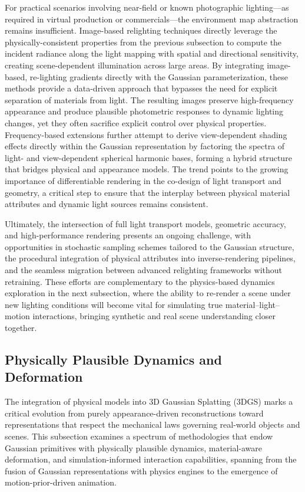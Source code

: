 \documentclass[11pt,a4paper]{article}
\begin{document}
For practical scenarios involving near-field or known photographic lighting---as required in virtual production or commercials---the environment map abstraction remains insufficient. Image-based relighting techniques directly leverage the physically-consistent properties from the previous subsection to compute the incident radiance along the light mapping with spatial and directional sensitivity, creating scene-dependent illumination across large areas. By integrating image-based, re-lighting gradients directly with the Gaussian parameterization, these methods provide a data-driven approach that bypasses the need for explicit separation of materials from light. The resulting images preserve high-frequency appearance and produce plausible photometric responses to dynamic lighting changes, yet they often sacrifice explicit control over physical properties. Frequency-based extensions further attempt to derive view-dependent shading effects directly within the Gaussian representation by factoring the spectra of light- and view-dependent spherical harmonic bases, forming a hybrid structure that bridges physical and appearance models. The trend points to the growing importance of differentiable rendering in the co-design of light transport and geometry, a critical step to ensure that the interplay between physical material attributes and dynamic light sources remains consistent.

Ultimately, the intersection of full light transport models, geometric accuracy, and high-performance rendering presents an ongoing challenge, with opportunities in stochastic sampling schemes tailored to the Gaussian structure, the procedural integration of physical attributes into inverse-rendering pipelines, and the seamless migration between advanced relighting frameworks without retraining. These efforts are complementary to the physics-based dynamics exploration in the next subsection, where the ability to re-render a scene under new lighting conditions will become vital for simulating true material--light--motion interactions, bringing synthetic and real scene understanding closer together.


\subsection{Physically Plausible Dynamics and Deformation}


The integration of physical models into 3D Gaussian Splatting (3DGS) marks a critical evolution from purely appearance-driven reconstructions toward representations that respect the mechanical laws governing real-world objects and scenes. This subsection examines a spectrum of methodologies that endow Gaussian primitives with physically plausible dynamics, material-aware deformation, and simulation-informed interaction capabilities, spanning from the fusion of Gaussian representations with physics engines to the emergence of motion-prior-driven animation.
\end{document}
